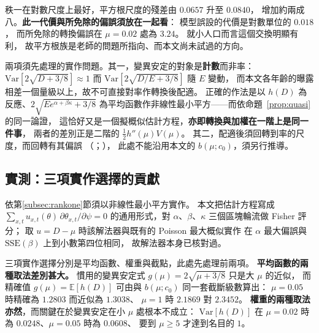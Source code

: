 \documentclass[UTF8, fontset=macnew, a4paper, 12pt]{ctexart}
\newcommand{\Ex}{\mathbb{E}}
\begin{document}
秩一在對數尺度上最好，平方根尺度的殘差由 $0.0657$ 升至 $0.0840$，
增加約兩成八。\textbf{此一代價與所免除的偏誤須放在一起看}：
模型誤設的代價是對數單位的 $0.018$，
而所免除的轉換偏誤在 $\mu=0.02$ 處為 $3.24$。
就小人口而言這個交換明顯有利，
故平方根族是老師的問題所指向、而本文尚未試過的方向。

兩項須先處理的實作問題。其一，變異安定的對象是\textbf{計數}而非率：
$\mathrm{Var}[2\sqrt{D+3/8}]\approx1$ 而
$\mathrm{Var}[2\sqrt{D/E+3/8}]$ 隨 $E$ 變動，
而本文各年齡的曝露相差一個量級以上，故不可直接對率作轉換後配適。
正確的作法是以 $h(D)$ 為反應、$2\sqrt{E e^{\alpha+\beta\kappa}+3/8}$
為平均函數作非線性最小平方——而依命題~\ref{prop:quasi} 的同一論證，
這恰好又是一個擬概似估計方程，\textbf{亦即轉換與加權在一階上是同一件事}，
兩者的差別正是二階的 $\tfrac12 h''(\mu)V(\mu)$。
其二，配適後須回轉到率的尺度，而回轉有其偏誤
（\citealp{duan1983}；\citealp{santossilva2006}），
此處不能沿用本文的 $b(\mu;c_0)$，須另行推導。


\subsection{實測：三項實作選擇的貢獻}\label{subsec:vstemp}

依第\ref{subsec:rankone}節須以非線性最小平方實作。
本文把估計方程寫成 $\sum_{x,t}u_{x,t}(\theta)\,\partial\theta_{x,t}/\partial\psi=0$
的通用形式，對 $\alpha$、$\beta$、$\kappa$ 三個區塊輪流做 Fisher 評分；
取 $u=D-\mu$ 時該解法器與既有的 Poisson 最大概似實作
在 $\alpha$ 最大偏誤與 $\mathrm{SSE}(\beta)$ 上到小數第四位相同，
故解法器本身已核對過。

三項實作選擇分別是平均函數、權重與截點，此處先處理前兩項。
\textbf{平均函數的兩種取法差別甚大。} 慣用的變異安定式
$g(\mu)=2\sqrt{\mu+3/8}$ 只是大 $\mu$ 的近似，
而精確值 $g(\mu)=\Ex[h(D)]$ 可由與 $b(\mu;c_0)$ 同一套截斷級數算出：
$\mu=0.05$ 時精確為 $1.2803$ 而近似為 $1.3038$、
$\mu=1$ 時 $2.1869$ 對 $2.3452$。
\textbf{權重的兩種取法亦然}，而關鍵在於變異安定在小 $\mu$ 處根本不成立：
$\mathrm{Var}[h(D)]$ 在 $\mu=0.02$ 時為 $0.0248$、$\mu=0.05$ 時為 $0.0608$、
要到 $\mu\ge5$ 才達到名目的 $1$。
\end{document}
